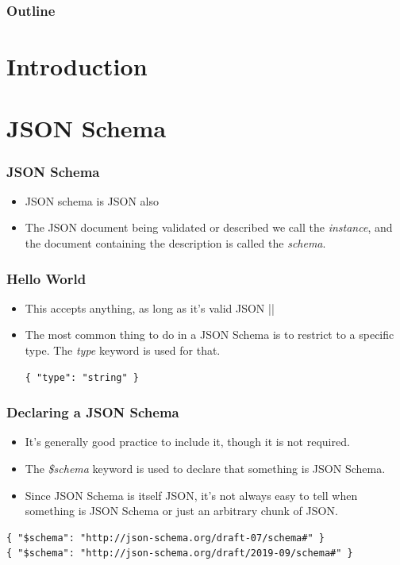 \documentclass{efd-lecture}
\begin{document}
\begin{frame}
  \titlepage{}
\end{frame}
\begin{frame}
  \frametitle{Outline}
  \tableofcontents{}
\end{frame}

\section{Introduction}

\section{JSON Schema}

\begin{frame}
  \frametitle{JSON Schema}
  \begin{itemize}
    \item JSON schema is JSON also
    \item The JSON document being validated or described we call the
      \textit{\color{YellowOrange} instance}, and the document containing the
      description is called the \textit{\color{GreenYellow} schema}.
  \end{itemize}
\end{frame}

\begin{frame}[fragile]
  \frametitle{Hello World}
  \begin{itemize}
    \item This accepts anything, as long as it’s valid JSON
      |{}|
    \item The most common thing to do in a JSON Schema is to restrict to a specific type. The \textit{\color{YellowOrange} type} keyword is used for that.
    \begin{verbatim}
{ "type": "string" }
    \end{verbatim}
  \end{itemize}
\end{frame}

\begin{frame}[fragile]
  \frametitle{Declaring a JSON Schema}
  \begin{itemize}
    \item It's generally good practice to include it, though it is not required.
    \item The \textit{\color{YellowOrange} \$schema} keyword is used to declare
        that something is JSON Schema.
    \item Since JSON Schema is itself JSON, it's not always easy to tell when
        something is JSON Schema or just an arbitrary chunk of JSON.
  \end{itemize}
  \begin{verbatim}
{ "$schema": "http://json-schema.org/draft-07/schema#" }
{ "$schema": "http://json-schema.org/draft/2019-09/schema#" }
  \end{verbatim}
\end{frame}
\end{document}
